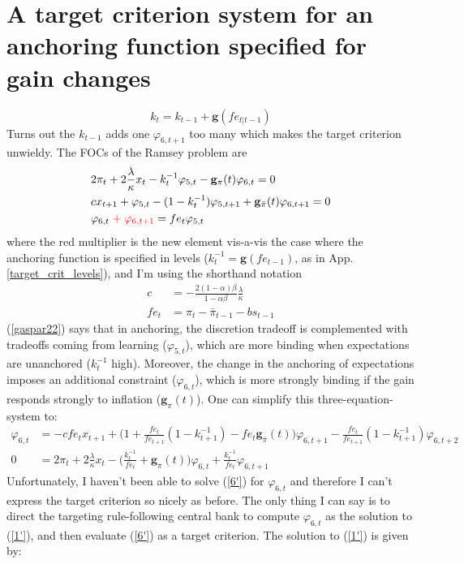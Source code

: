 \documentclass[11pt]{article}
\renewcommand{\[}{\begin{equation}}
\renewcommand{\]}{\end{equation}}
\begin{document}
\section{A target criterion system for an anchoring function specified for gain changes}\label{target_crit_changes}
\begin{equation}
k_t = k_{t-1} + \mathbf{g}(fe_{t|t-1})
\end{equation}
Turns out the $k_{t-1}$ adds one $\varphi_{6,t+1}$ too many which makes the target criterion unwieldy. The FOCs of the Ramsey problem are
\begin{align}
& 2\pi_t + 2\frac{\lambda}{\kappa}x_t -k_t^{-1} \varphi_{5,t} - \mathbf{g}_{\pi}(t)\varphi_{6,t}  = 0 \label{gaspar22}\\
& c x_{t+1} + \varphi_{5,t} -(1-k_t^{-1})\varphi_{5,t+1} +\mathbf{g}_{\bar{\pi}}(t)\varphi_{6,t+1} = 0 \label{gaspar21}\\
& \varphi_{6,t} \; \textcolor{red}{+\; \varphi_{6,t+1}} = fe_t \varphi_{5,t} \label{constraints}
\end{align}
where the red multiplier is the new element vis-a-vis the case where the anchoring function is specified in levels ($k_t^{-1} = \mathbf{g}(fe_{t-1})$, as in App. \ref{target_crit_levels}), and I'm using the shorthand notation
\begin{align}
c & = -\frac{2(1-\alpha)\beta}{1-\alpha\beta}\frac{\lambda}{\kappa} \\ 
fe_t & = \pi_t - \bar{\pi}_{t-1}-b s_{t-1}
\end{align}
(\ref{gaspar22}) says that in anchoring, the discretion tradeoff is complemented with tradeoffs coming from learning ($\varphi_{5,t}$), which are more binding when expectations are unanchored ($k_{t}^{-1}$ high). Moreover, the change in the anchoring of expectations imposes an additional constraint ($\varphi_{6,t}$), which is more strongly binding if the gain responds strongly to inflation ($\mathbf{g}_{\pi}(t)$).
One can simplify this three-equation-system to:
\begin{align}
\varphi_{6,t} & = -c fe_t x_{t+1} + \bigg(1+ \frac{fe_t}{fe_{t+1}}(1-k_{t+1}^{-1}) -fe_t \mathbf{g}_{\bar{\pi}}(t) \bigg) \varphi_{6,t+1} -\frac{fe_t}{fe_{t+1}}(1-k_{t+1}^{-1})\varphi_{6,t+2}\label{6'} \\
0 & = 2\pi_t + 2\frac{\lambda}{\kappa}x_t   - \bigg( \frac{k_t^{-1}}{fe_t} + \mathbf{g}_{\pi}(t)\bigg)\varphi_{6,t} + \frac{k_t^{-1}}{fe_t}\varphi_{6,t+1}\label{1'}
\end{align}
Unfortunately, I haven't been able to solve (\ref{6'}) for $\varphi_{6,t}$ and therefore I can't express the target criterion so nicely as before. The only thing I can say is to direct the targeting rule-following central bank to compute $\varphi_{6,t}$ as the solution to (\ref{1'}), and then evaluate (\ref{6'}) as a target criterion. The solution to (\ref{1'}) is given by:
\end{document}
